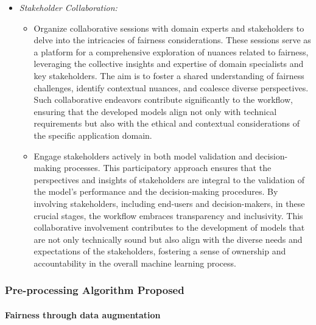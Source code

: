 \begin{itemize}
    
    \item \emph{Stakeholder Collaboration:}
    
    \begin{itemize}
    
        \item Organize collaborative sessions with domain experts and stakeholders to delve into the intricacies of fairness considerations. These sessions serve as a platform for a comprehensive exploration of nuances related to fairness, leveraging the collective insights and expertise of domain specialists and key stakeholders. The aim is to foster a shared understanding of fairness challenges, identify contextual nuances, and coalesce diverse perspectives. Such collaborative endeavors contribute significantly to the workflow, ensuring that the developed models align not only with technical requirements but also with the ethical and contextual considerations of the specific application domain.
    
        
        \item Engage stakeholders actively in both model validation and decision-making processes. This participatory approach ensures that the perspectives and insights of stakeholders are integral to the validation of the model's performance and the decision-making procedures. By involving stakeholders, including end-users and decision-makers, in these crucial stages, the workflow embraces transparency and inclusivity. This collaborative involvement contributes to the development of models that are not only technically sound but also align with the diverse needs and expectations of the stakeholders, fostering a sense of ownership and accountability in the overall machine learning process.
    
    \end{itemize}

\end{itemize}

\subsubsection{Pre-processing Algorithm Proposed}

\paragraph{Fairness through data augmentation}
\label{subsec:ftdr}

